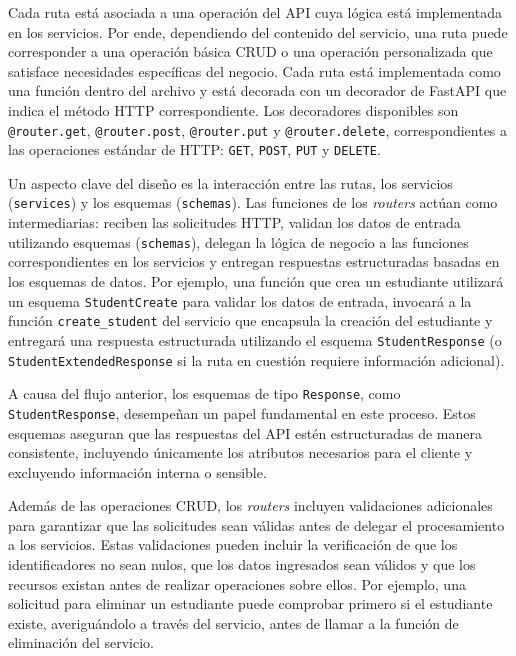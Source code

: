 Cada ruta está asociada a una operación del \gls{API} cuya lógica está implementada en los servicios. Por ende, dependiendo del contenido del servicio, una ruta puede corresponder a una operación básica \gls{CRUD} o una operación personalizada que satisface necesidades específicas del negocio. Cada ruta está implementada como una función dentro del archivo y está decorada con un decorador de \gls{FastAPI} que indica el método \gls{HTTP} correspondiente. Los decoradores disponibles son \texttt{@router.get}, \texttt{@router.post}, \texttt{@router.put} y \texttt{@router.delete}, correspondientes a las operaciones estándar de \gls{HTTP}: \texttt{GET}, \texttt{POST}, \texttt{PUT} y \texttt{DELETE}. 

Un aspecto clave del diseño es la interacción entre las rutas, los servicios (\texttt{services}) y los esquemas (\texttt{schemas}). Las funciones de los \textit{routers} actúan como intermediarias: reciben las solicitudes \gls{HTTP}, validan los datos de entrada utilizando esquemas (\texttt{schemas}), delegan la lógica de negocio a las funciones correspondientes en los servicios y entregan respuestas estructuradas basadas en los esquemas de datos. Por ejemplo, una función que crea un estudiante utilizará un esquema \texttt{StudentCreate} para validar los datos de entrada, invocará a la función \texttt{create\_student} del servicio que encapsula la creación del estudiante y entregará una respuesta estructurada utilizando el esquema \texttt{StudentResponse} (o \texttt{StudentExtendedResponse} si la ruta en cuestión requiere información adicional).

A causa del flujo anterior, los esquemas de tipo \texttt{Response}, como \texttt{StudentResponse}, desempeñan un papel fundamental en este proceso. Estos esquemas aseguran que las respuestas del \gls{API} estén estructuradas de manera consistente, incluyendo únicamente los atributos necesarios para el cliente y excluyendo información interna o sensible. 

Además de las operaciones \gls{CRUD}, los \textit{routers} incluyen validaciones adicionales para garantizar que las solicitudes sean válidas antes de delegar el procesamiento a los servicios. Estas validaciones pueden incluir la verificación de que los identificadores no sean nulos, que los datos ingresados sean válidos y que los recursos existan antes de realizar operaciones sobre ellos. Por ejemplo, una solicitud para eliminar un estudiante puede comprobar primero si el estudiante existe, averiguándolo a través del servicio, antes de llamar a la función de eliminación del servicio.

